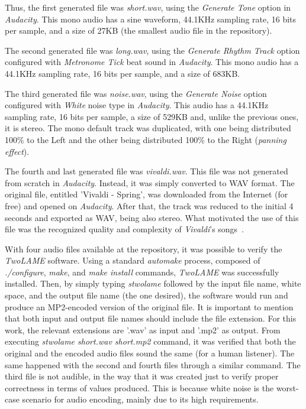 Thus, the first generated file was \textit{short.wav}, using the \textit{Generate Tone} option in \textit{Audacity}. This mono audio has a sine waveform, 44.1KHz sampling rate, 16 bits per sample, and a size of 27KB (the smallest audio file in the repository).

The second generated file was \textit{long.wav}, using the \textit{Generate Rhythm Track} option configured with \textit{Metronome Tick} beat sound in \textit{Audacity}. This mono audio has a 44.1KHz sampling rate, 16 bits per sample, and a size of 683KB.

The third generated file was \textit{noise.wav}, using the \textit{Generate Noise} option configured with \textit{White} noise type in \textit{Audacity}. This audio has a 44.1KHz sampling rate, 16 bits per sample, a size of 529KB and, unlike the previous ones, it is stereo. The mono default track was duplicated, with one being distributed 100\% to the Left and the other being distributed 100\% to the Right (\textit{panning effect}).

The fourth and last generated file was \textit{vivaldi.wav}. This file was not generated from scratch in \textit{Audacity}. Instead, it was simply converted to WAV format. The original file, entitled 'Vivaldi - Spring', was downloaded from the Internet (for free) and opened on \textit{Audacity}. After that, the track was reduced to the initial 4 seconds and exported as WAV, being also stereo. What motivated the use of this file was the recognized quality and complexity of \textit{Vivaldi}'s songs~\cite{vivaldi}.

With four audio files available at the repository, it was possible to verify the \textit{TwoLAME} software. Using a standard \textit{automake} process, composed of \textit{./configure}, \textit{make}, and \textit{make install} commands, \textit{TwoLAME} was successfully installed. Then, by simply typing \textit{stwolame} followed by the input file name, white space, and the output file name (the one desired), the software would run and produce an MP2-encoded version of the original file.
It is important to mention that both input and output file names should include the file extension. For this work, the relevant extensions are '.wav' as input and '.mp2' as output.
From executing \textit{stwolame short.wav short.mp2} command, it was verified that both the original and the encoded audio files sound the same (for a human listener). The same happened with the second and fourth files through a similar command. 
The third file is not audible, in the way that it was created just to verify proper correctness in terms of values produced. This is because white noise is the worst-case scenario for audio encoding, mainly due to its high requirements. \\


